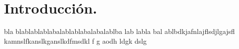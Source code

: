 \chapter*{Introducci\'on.}

bla blablablablabalablablabalabalablba lab labla bal ablbdkjafnlajflsdjlgajsfl kamnslfkanslkganslkdfmsdkl f
g aodh ldgk dslg 
